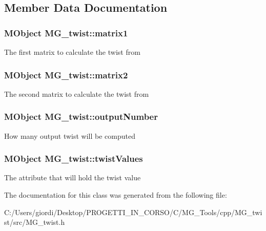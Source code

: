 \subsection{Member Data Documentation}
\hypertarget{class_m_g__twist_a1f56e50333669ce2a38f71e3226ab18e}{
\subsubsection[{matrix1}]{\setlength{\rightskip}{0pt plus 5cm}M\-Object M\-G\-\_\-twist\-::matrix1\hspace{0.3cm}{\ttfamily [static]}}}\label{class_m_g__twist_a1f56e50333669ce2a38f71e3226ab18e}
The first matrix to calculate the twist from \hypertarget{class_m_g__twist_a529b723501fff0dd68b7062a8816195b}{
\subsubsection[{matrix2}]{\setlength{\rightskip}{0pt plus 5cm}M\-Object M\-G\-\_\-twist\-::matrix2\hspace{0.3cm}{\ttfamily [static]}}}\label{class_m_g__twist_a529b723501fff0dd68b7062a8816195b}
The second matrix to calculate the twist from \hypertarget{class_m_g__twist_a91ee2296147fba36025cc06ec0ed9db1}{
\subsubsection[{output\-Number}]{\setlength{\rightskip}{0pt plus 5cm}M\-Object M\-G\-\_\-twist\-::output\-Number\hspace{0.3cm}{\ttfamily [static]}}}\label{class_m_g__twist_a91ee2296147fba36025cc06ec0ed9db1}
How many output twist will be computed \hypertarget{class_m_g__twist_a112610270816a7e39e633a779f3f6f49}{
\subsubsection[{twist\-Values}]{\setlength{\rightskip}{0pt plus 5cm}M\-Object M\-G\-\_\-twist\-::twist\-Values\hspace{0.3cm}{\ttfamily [static]}}}\label{class_m_g__twist_a112610270816a7e39e633a779f3f6f49}
The attribute that will hold the twist value 

The documentation for this class was generated from the following file\-:\begin{DoxyCompactItemize}
\item 
C\-:/\-Users/giordi/\-Desktop/\-P\-R\-O\-G\-E\-T\-T\-I\-\_\-\-I\-N\-\_\-\-C\-O\-R\-S\-O/\-C/\-M\-G\-\_\-\-Tools/cpp/\-M\-G\-\_\-twist/src/M\-G\-\_\-twist.\-h\end{DoxyCompactItemize}
